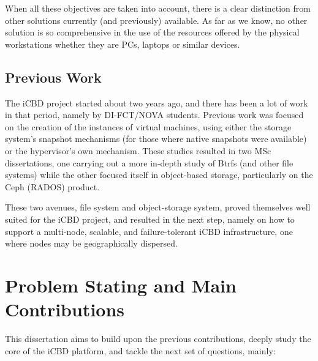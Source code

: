 When all these objectives are taken into account, there is a clear distinction from other solutions currently (and previously) available. As far as we know, no other solution is so comprehensive in the use of the resources offered by the physical workstations whether they are PCs, laptops or similar devices.


\subsection{Previous Work} %
\label{sub:intro_previous_work}

The iCBD project started about two years ago, and there has been a lot of work in that period, namely by DI-FCT/NOVA students. Previous work was focused on the creation of the instances of virtual machines, using either the storage system’s snapshot mechanisms (for those where native snapshots were available) or the hypervisor’s own mechanism. These studies resulted in two MSc dissertations, one carrying out a more in-depth study of Btrfs (and other file systems) while the other focused itself in object-based storage, particularly on the Ceph (RADOS) product.

These two avenues, file system and object-storage system, proved themselves well suited for the iCBD project, and resulted in the next step, namely on how to support a multi-node, scalable, and failure-tolerant iCBD infrastructure, one where nodes may be geographically dispersed.

\newpage

\section{Problem Stating and Main Contributions}
\label{sec:intro_project_contributions}

This dissertation aims to build upon the previous contributions, deeply study the core of the iCBD platform, and tackle the next set of questions, mainly:

